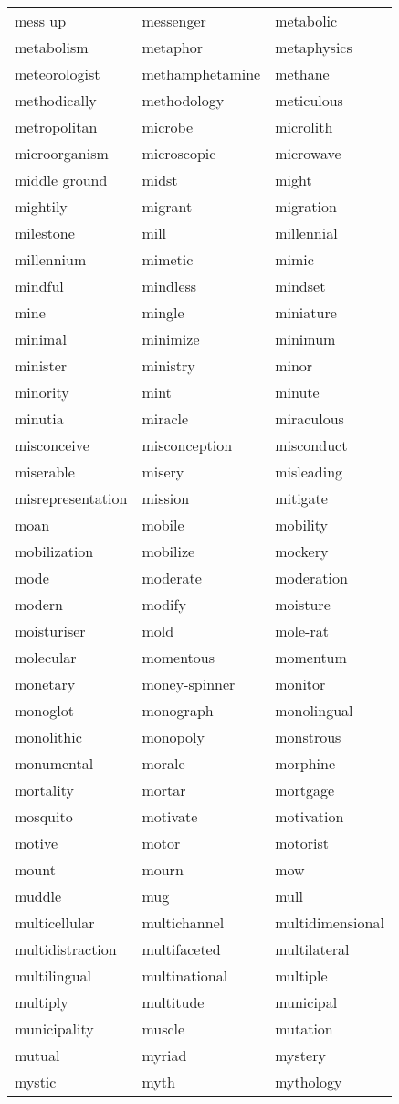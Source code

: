 \documentclass{minimal}
\begin{document}
\begin{longtable}{p{2.7cm}@{\hskip 0.2cm}p{2.7cm}@{\hskip 0.2cm}p{2.7cm}}
mess up & messenger & metabolic \\
metabolism & metaphor & metaphysics \\
meteorologist & methamphetamine & methane \\
methodically & methodology & meticulous \\
metropolitan & microbe & microlith \\
microorganism & microscopic & microwave \\
middle ground & midst & might \\
mightily & migrant & migration \\
milestone & mill & millennial \\
millennium & mimetic & mimic \\
mindful & mindless & mindset \\
mine & mingle & miniature \\
minimal & minimize & minimum \\
minister & ministry & minor \\
minority & mint & minute \\
minutia & miracle & miraculous \\
misconceive & misconception & misconduct \\
miserable & misery & misleading \\
misrepresentation & mission & mitigate \\
moan & mobile & mobility \\
mobilization & mobilize & mockery \\
mode & moderate & moderation \\
modern & modify & moisture \\
moisturiser & mold & mole-rat \\
molecular & momentous & momentum \\
monetary & money-spinner & monitor \\
monoglot & monograph & monolingual \\
monolithic & monopoly & monstrous \\
monumental & morale & morphine \\
mortality & mortar & mortgage \\
mosquito & motivate & motivation \\
motive & motor & motorist \\
mount & mourn & mow \\
muddle & mug & mull \\
multicellular & multichannel & multidimensional \\
multidistraction & multifaceted & multilateral \\
multilingual & multinational & multiple \\
multiply & multitude & municipal \\
municipality & muscle & mutation \\
mutual & myriad & mystery \\
mystic & myth & mythology
\end{longtable}
\end{document}
